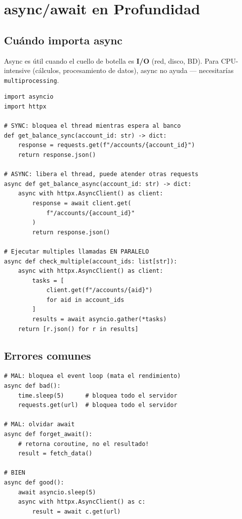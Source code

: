 \documentclass[11pt,a4paper]{article}
\begin{document}
\section{async/await en Profundidad}

\subsection{Cuándo importa async}

\begin{keybox}
Async es útil cuando el cuello de botella es \textbf{I/O} (red, disco, BD).
Para CPU-intensive (cálculos, procesamiento de datos), async no ayuda ---
necesitarías \texttt{multiprocessing}.
\end{keybox}

\begin{pybox}
\begin{lstlisting}[style=python]
import asyncio
import httpx

# SYNC: bloquea el thread mientras espera al banco
def get_balance_sync(account_id: str) -> dict:
    response = requests.get(f"/accounts/{account_id}")
    return response.json()

# ASYNC: libera el thread, puede atender otras requests
async def get_balance_async(account_id: str) -> dict:
    async with httpx.AsyncClient() as client:
        response = await client.get(
            f"/accounts/{account_id}"
        )
        return response.json()

# Ejecutar multiples llamadas EN PARALELO
async def check_multiple(account_ids: list[str]):
    async with httpx.AsyncClient() as client:
        tasks = [
            client.get(f"/accounts/{aid}")
            for aid in account_ids
        ]
        results = await asyncio.gather(*tasks)
    return [r.json() for r in results]
\end{lstlisting}
\end{pybox}

\subsection{Errores comunes}

\begin{alertbox}
\begin{lstlisting}[style=python]
# MAL: bloquea el event loop (mata el rendimiento)
async def bad():
    time.sleep(5)      # bloquea todo el servidor
    requests.get(url)  # bloquea todo el servidor

# MAL: olvidar await
async def forget_await():
    # retorna coroutine, no el resultado!
    result = fetch_data()

# BIEN
async def good():
    await asyncio.sleep(5)
    async with httpx.AsyncClient() as c:
        result = await c.get(url)
\end{lstlisting}
\end{alertbox}
\end{document}
